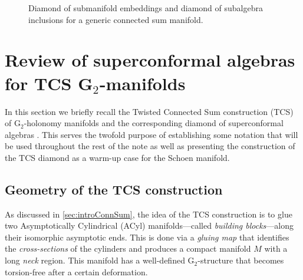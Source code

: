 \documentclass{pspum-l}
\theoremstyle{definition}
\theoremstyle{remark}
\numberwithin{equation}{section}
\begin{document}
\begin{figure}
\caption{Diamond of submanifold embeddings and diamond of subalgebra inclusions for a generic connected sum manifold.}
\label{fig:Diamond}
\end{figure}




\section{Review of superconformal algebras for TCS G$_2$-manifolds}

\label{sec:TCS}

In this section we briefly recall the Twisted Connected Sum construction (TCS) of G$_2$-holonomy manifolds \cite{Kovalev:2003, Corti:2012, Corti:2012kd} and the corresponding diamond of superconformal algebras \cite{Fiset:2018huv, Fiset:2021ruv}. This serves the twofold purpose of establishing some notation that will be used throughout the rest of the note as well as presenting the construction of the TCS diamond as a warm-up case for the Schoen manifold.

\subsection{Geometry of the TCS construction}

\label{sec:TCSgeometry}

As discussed in \cref{sec:introConnSum}, the idea of the TCS construction is to glue two Asymptotically Cylindrical (ACyl) manifolds---called \emph{building blocks}---along their isomorphic asymptotic ends. This is done via a \emph{gluing map} that identifies the \emph{cross-sections} of the cylinders and produces a compact manifold $M$ with a long \emph{neck} region. This manifold has a well-defined G$_2$-structure that becomes torsion-free after a certain deformation.
\end{document}
